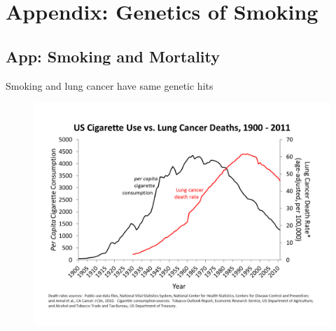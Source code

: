 \documentclass[10pt,compress,xcolor=dvipsnames,aspectratio=169]{beamer}    %
\newcounter{ex}
\newcommand{\1}[1]{\mathrm{1\hspace*{-2.5pt}l}[#1]}	%
\begin{document}
\appendix
\section{Appendix: Genetics of Smoking}
\subsection{App: Smoking and Mortality}
%
%
%
%
%
%
%
%
%

\begin{frame}{Smoking and lung cancer have same genetic hits}
\begin{figure}
  \centering
    \includegraphics[height=0.8\textheight]{lung_cancer_rates.pdf}
\end{figure}

\end{frame}
\end{document}

